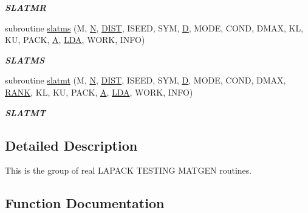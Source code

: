 \begin{DoxyCompactItemize}
\begin{DoxyCompactList}\small\item\em {\bfseries S\+L\+A\+T\+M\+R} \end{DoxyCompactList}\item 
subroutine \hyperlink{group__real__matgen_gaa588d430895758d307f7d0243b9adfaa}{slatms} (M, \hyperlink{polmisc_8c_a0240ac851181b84ac374872dc5434ee4}{N}, \hyperlink{superlu__enum__consts_8h_af00a42ecad444bbda75cde1b64bd7e72ac04fbbdf0d80a4ad25e565541deeebd7}{D\+I\+S\+T}, I\+S\+E\+E\+D, S\+Y\+M, \hyperlink{odrpack_8h_a7dae6ea403d00f3687f24a874e67d139}{D}, M\+O\+D\+E, C\+O\+N\+D, D\+M\+A\+X, K\+L, K\+U, P\+A\+C\+K, \hyperlink{classA}{A}, \hyperlink{example__user_8c_ae946da542ce0db94dced19b2ecefd1aa}{L\+D\+A}, W\+O\+R\+K, I\+N\+F\+O)
\begin{DoxyCompactList}\small\item\em {\bfseries S\+L\+A\+T\+M\+S} \end{DoxyCompactList}\item 
subroutine \hyperlink{group__real__matgen_ga2d84d19eeb5d603e3429f9e22ef34ff1}{slatmt} (M, \hyperlink{polmisc_8c_a0240ac851181b84ac374872dc5434ee4}{N}, \hyperlink{superlu__enum__consts_8h_af00a42ecad444bbda75cde1b64bd7e72ac04fbbdf0d80a4ad25e565541deeebd7}{D\+I\+S\+T}, I\+S\+E\+E\+D, S\+Y\+M, \hyperlink{odrpack_8h_a7dae6ea403d00f3687f24a874e67d139}{D}, M\+O\+D\+E, C\+O\+N\+D, D\+M\+A\+X, \hyperlink{splinemodule_8c_a3a88bcc63386de30443dacede2e01847}{R\+A\+N\+K}, K\+L, K\+U, P\+A\+C\+K, \hyperlink{classA}{A}, \hyperlink{example__user_8c_ae946da542ce0db94dced19b2ecefd1aa}{L\+D\+A}, W\+O\+R\+K, I\+N\+F\+O)
\begin{DoxyCompactList}\small\item\em {\bfseries S\+L\+A\+T\+M\+T} \end{DoxyCompactList}\end{DoxyCompactItemize}


\subsection{Detailed Description}
This is the group of real L\+A\+P\+A\+C\+K T\+E\+S\+T\+I\+N\+G M\+A\+T\+G\+E\+N routines. 

\subsection{Function Documentation}
\hypertarget{group__real__matgen_gaf0a706a38b6c86c926c695f46ab79238}{}
